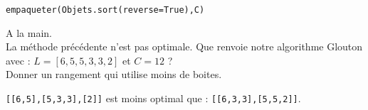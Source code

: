 \begin{solution}
\verb?empaqueter(Objets.sort(reverse=True),C)?
\end{solution}

\begin{exercice}A la main.\\
La méthode précédente n'est pas optimale. Que renvoie notre algorithme Glouton avec : $L=[6,5,5,3,3,2]$ et $C=12$ ?\\
Donner un rangement qui utilise moins de boites.
\end{exercice}

\begin{solution}
\verb?[[6,5],[5,3,3],[2]]? est moins optimal que : \verb?[[6,3,3],[5,5,2]]?.
\end{solution}




